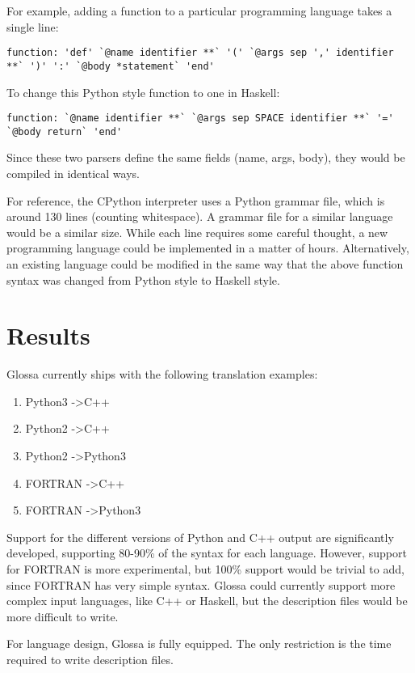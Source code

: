 \documentclass{article}
\begin{document}
For example, adding a function to a particular programming language takes a single line:
\begin{verbatim}
function: 'def' `@name identifier **` '(' `@args sep ',' identifier **` ')' ':' `@body *statement` 'end'
\end{verbatim}
To change this Python style function to one in Haskell:
\begin{verbatim}
function: `@name identifier **` `@args sep SPACE identifier **` '=' `@body return` 'end'
\end{verbatim}
Since these two parsers define the same fields (name, args, body), they would be compiled in identical ways.

For reference, the CPython interpreter uses a Python grammar file, which is around 130 lines (counting whitespace).
A grammar file for a similar language would be a similar size.
While each line requires some careful thought, a new programming language could be implemented in a matter of hours.
Alternatively, an existing language could be modified in the same way that the above function syntax was changed from Python style to Haskell style.

\section{Results}

Glossa currently ships with the following translation examples:
\begin{enumerate}
    \item Python3 -\textgreater C++
    \item Python2 -\textgreater C++ 
    \item Python2 -\textgreater Python3
    \item FORTRAN -\textgreater C++ 
    \item FORTRAN -\textgreater Python3 
\end{enumerate}

Support for the different versions of Python and C++ output are significantly developed, supporting 80-90\% of the syntax for each language. 
However, support for FORTRAN is more experimental, but 100\% support would be trivial to add, since FORTRAN has very simple syntax.
Glossa could currently support more complex input languages, like C++ or Haskell, but the description files would be more difficult to write.

For language design, Glossa is fully equipped. The only restriction is the time required to write description files.
\end{document}
